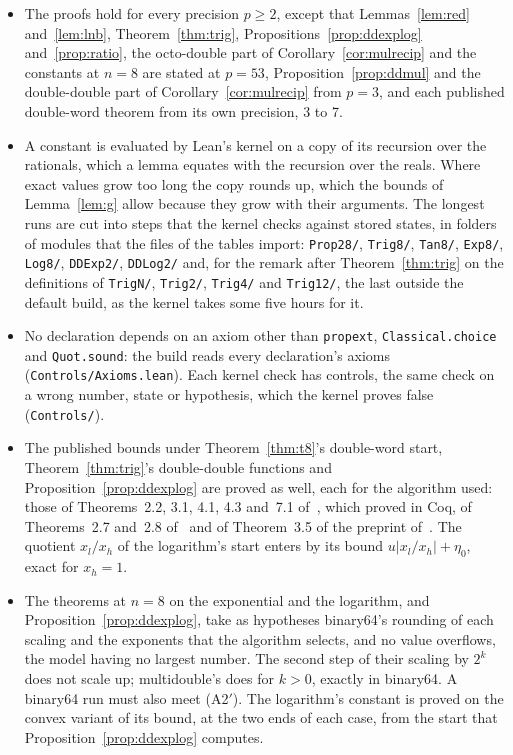 \begin{itemize}
\item The proofs hold for every precision $p \ge 2$, except that Lemmas~\ref{lem:red} and~\ref{lem:lnb},
Theorem~\ref{thm:trig}, Propositions~\ref{prop:ddexplog} and~\ref{prop:ratio}, the octo-double part of
Corollary~\ref{cor:mulrecip} and the constants at $n = 8$ are stated at $p = 53$, Proposition~\ref{prop:ddmul} and the
double-double part of Corollary~\ref{cor:mulrecip} from $p = 3$, and each published double-word theorem from its own
precision, 3 to 7.
\item A constant is evaluated by Lean's kernel on a copy of its recursion over the rationals, which a lemma equates
with the recursion over the reals. Where exact values grow too long the copy rounds up, which the bounds of
Lemma~\ref{lem:g} allow because they grow with their arguments. The longest runs are cut into steps
that the kernel checks against stored states, in folders of modules that the files of the tables import:
\texttt{Prop28/}, \texttt{Trig8/}, \texttt{Tan8/}, \texttt{Exp8/}, \texttt{Log8/}, \texttt{DDExp2/},
\texttt{DDLog2/} and, for the remark after Theorem~\ref{thm:trig} on the definitions of \texttt{TrigN/},
\texttt{Trig2/}, \texttt{Trig4/} and \texttt{Trig12/}, the last outside the default build, as the kernel takes some
five hours for it.
\item No declaration depends on an axiom other than \texttt{propext}, \texttt{Classical.choice} and
\texttt{Quot.sound}: the build reads every declaration's axioms (\texttt{Controls/Axioms.lean}). Each kernel check
has controls, the same check on a wrong number, state or hypothesis, which the kernel proves false
(\texttt{Controls/}).
\item The published bounds under Theorem~\ref{thm:t8}'s double-word start, Theorem~\ref{thm:trig}'s
double-double functions and Proposition~\ref{prop:ddexplog} are proved as well, each for the algorithm used: those
of Theorems~2.2, 3.1, 4.1, 4.3 and~7.1 of~\cite{JMP17}, which \cite{MR22} proved in Coq, of Theorems~2.7 and~2.8
of~\cite{MR22} and of Theorem~3.5 of the preprint of~\cite{LLMPR23}. The quotient $x_l/x_h$ of the logarithm's start
enters by its bound $u|x_l/x_h| + \eta_0$, exact for $x_h = 1$.
\item The theorems at $n = 8$ on the exponential and the logarithm, and Proposition~\ref{prop:ddexplog}, take as
hypotheses binary64's rounding of each scaling and the exponents that the algorithm selects, and no value overflows,
the model having no largest number. The second step of their scaling by $2^k$ does not scale up; multidouble's does
for $k > 0$, exactly in binary64. A binary64 run must also meet (A2$'$). The
logarithm's constant is proved on the convex variant of its bound, at the two ends of each case, from the start that
Proposition~\ref{prop:ddexplog} computes.
\end{itemize}

